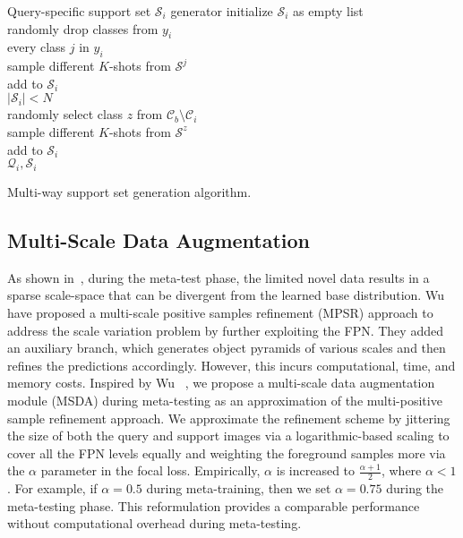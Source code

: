 \documentclass[10pt,twocolumn,letterpaper]{article}
\makeatletter
\newcommand{\algorithmfootnote}[2][\footnotesize]{\let\old@algocf@finish\@algocf@finish \def\@algocf@finish{\old@algocf@finish \leavevmode\rlap{\begin{minipage}{\linewidth}
    #1#2
    \end{minipage}}}}
\makeatother
\begin{document}
\setlength{\textfloatsep}{15pt}\begin{algorithm}[t!]
    \algorithmfootnote{$y_0$ denotes the initial value.}
	\begin{algo}{Query-specific support set $\mathcal{S}_i$ generator}
		{
			\small 
			\label{alg:support_algo}
		}   initialize $\mathcal{S}_i$ as empty list\\
		randomly drop classes from $y_i$\\ 
		\qfor every class $j$ in $y_i$ \\
		sample different $K$-shots from $\mathcal{S}^j$ \\ 
		add  to $\mathcal{S}_i$\qrof\\
		
		\qwhile $\mid \mathcal{S}_i \mid < N$ \\
		randomly select class $z$ from $\mathcal{C}_b \setminus \mathcal{C}_i$\label{algo_line:removal}\\
		sample different $K$-shots from $\mathcal{S}^z$\\
		add to $\mathcal{S}_i$\qelihw\\
		\qreturn $\mathcal{Q}_i, \mathcal{S}_i$
	\end{algo}
	\caption[Multi-way support set $s^i$]{Multi-way support set generation algorithm.}
    
\end{algorithm}
\vspace{-1em}
 
\subsection{Multi-Scale Data Augmentation}

As shown in~\cite{MPSR}, during the meta-test phase, the limited novel data results in a sparse scale-space that can be divergent from the learned base distribution. Wu \etal~\cite{MPSR} have proposed a multi-scale positive samples refinement (MPSR) approach to address the scale variation problem by further exploiting the FPN. They added an auxiliary branch, which generates object pyramids of various scales and then refines the predictions accordingly. However, this incurs computational, time, and memory costs. Inspired by Wu \etal~\cite{MPSR}, we propose a multi-scale data augmentation module (MSDA) during meta-testing as an approximation of the multi-positive sample refinement approach. We approximate the refinement scheme by jittering the size of both the query and support images via a logarithmic-based scaling to cover all the FPN levels equally and weighting the foreground samples more via the $\alpha$ parameter in the focal loss. Empirically, $\alpha$ is increased to $\frac{\alpha + 1}{2}$, where $\alpha < 1$. For example, if $\alpha=0.5$ during meta-training, then we set $\alpha=0.75$ during the meta-testing phase. This reformulation provides a comparable performance without computational overhead during meta-testing.  
\end{document}
